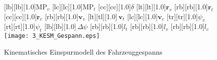 \begin{figure}
    [lb][lb][1.0]{$\mathrm{MP}_v$}
	[lc][lc][1.0]{$\mathrm{MP}_t$}
	[cc][cc][1.0]{$\delta$}
	[lt][lt][1.0]{$\boldsymbol r_v$}
	[rb][rb][1.0]{$\boldsymbol r_t$}
	[cc][cc][1.0]{$\boldsymbol r_c$}
	[rb][rb][1.0]{$\boldsymbol v_v$}
	[lt][tl][1.0]{$\,\boldsymbol v_t$}
	[lc][lc][1.0]{$\boldsymbol v_c$}
	[tr][tr][1.0]{$\psi_v$}
	[rt][rt][1.0]{$\psi_t$}
	[lb][lb][1.0]{$\,\Delta\psi$}
	[rb][rb][1.0]{$l_t$}	
	[rb][rb][1.0]{$l_v$}	
	[rb][rb][1.0]{$l_c$}	
    \centering
    \texttt{[image: 3\_KESM\_Gespann.eps]}
    \caption[Kinematisches Einspurmodell des Fahrzeuggespanns]{Kinematisches Einspurmodell des Fahrzeuggespanns }
    \label{fig:KESM_Gespann}
\end{figure}




